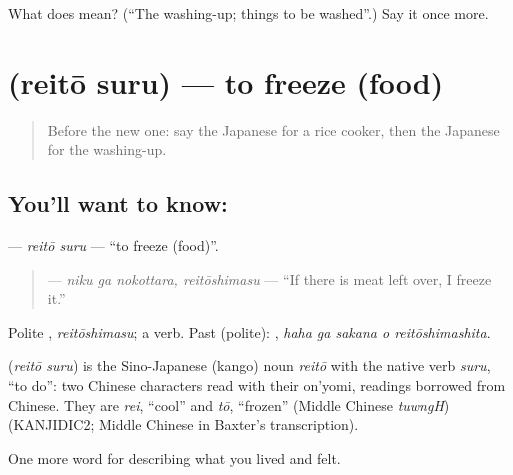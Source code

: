 \begin{tcolorbox}[breakable,colback=teal!4,colframe=teal!35!black,title={Before you move on}]
What does  mean? (\textquotedblleft{}The washing-up; things to be washed\textquotedblright{}.) Say it once more.
\end{tcolorbox}
\section[\texorpdfstring{\ja{れいとうする} (reitō suru)}{れいとうする (reitō suru)}]{ (reitō suru) — to freeze (food)}

\label{lesson:JA-C493-reitou-suru}



\begin{quote}
Before the new one: say the Japanese for a rice cooker, then the Japanese for the washing-up.
\end{quote}

\subsection*{You'll want to know: }
\textbf{} — \emph{reitō suru} — \textquotedblleft{}to freeze (food)\textquotedblright{}.

\begin{quote}
\textbf{ } — \emph{niku ga nokottara, reitōshimasu} — \textquotedblleft{}If there is meat left over, I freeze it.\textquotedblright{}
\end{quote}

Polite \textbf{}, \emph{reitōshimasu}; a  verb. Past (polite): \textbf{  }, \emph{haha ga sakana o reitōshimashita}.

\begin{cousinweb}
\textbf{} (\emph{reitō suru}) is the Sino-Japanese (kango) noun \emph{reitō} with the native verb \emph{suru}, \textquotedblleft{}to do\textquotedblright{}: two Chinese characters read with their on'yomi, readings borrowed from Chinese. They are \emph{rei}, \textquotedblleft{}cool\textquotedblright{} and \emph{tō}, \textquotedblleft{}frozen\textquotedblright{} (Middle Chinese \emph{tuwngH}) (KANJIDIC2; Middle Chinese in Baxter's transcription).
\end{cousinweb}

\begin{grammarlens}[title={What you've built}]
One more word for describing what you lived and felt.
\end{grammarlens}

